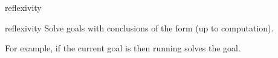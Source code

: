 \begin{tactic}{reflexivity}
  \begin{tsyntax}[empty]{reflexivity}
    Solve goals with conclusions of the form  (up to
    computation).

    For example, if the current goal is
    then running
    solves the goal.
  \end{tsyntax}
\end{tactic}
